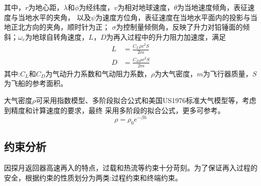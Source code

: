 其中，$r$为地心距，$\lambda$和$\phi$为经纬度，$v$为相对地球速度，$\theta$为当地速度倾角，表征速度与当地水平的夹角，
以及$\psi$为速度方位角，表征速度在当地水平面内的投影与当地正北方向的夹角，顺时针为正；%
$\sigma$为控制量倾侧角，反映了升力对铅锤面的倾斜；$ \omega_e $为地球自转角速度，$L$，$D$为再入过程中的升力阻力加速度，满足
\begin{align}
	L & =\frac{C_L\rho v^2S}{2m} \\
	D & =\frac{C_D\rho v^2S}{2m}
\end{align}
其中:$ C_L $和$ C_D $为气动升力系数和气动阻力系数，$ \rho $为大气密度，$ m $为飞行器质量，$ S $为飞船的参考面积。

大气密度$ \rho $可采用指数模型、多阶段拟合公式和美国US1976标准大气模型等，考虑到精度和计算速度的要求，最终
采用多阶段的拟合公式，更多可参考。
\begin{equation}
	\rho=\rho_0 e^{-\beta h}
\end{equation}

\subsection{约束分析}
因探月返回器高速再入的特点，过载和热流等约束十分苛刻。为了保证再入过程的安全，根据约束的性质划分为两类:过程约束和终端约束。
